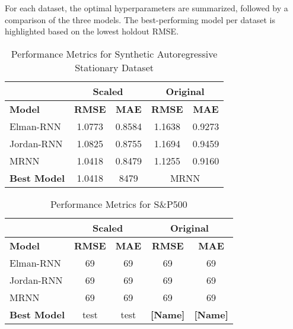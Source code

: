\documentclass[conference, 10pt]{IEEEtran}
\begin{document}
For each dataset, the optimal hyperparameters are summarized, followed by a comparison of the three models. The
best-performing model per dataset is highlighted based on the lowest holdout RMSE.

\begin{table}[h]
    \centering
    \begin{tabular}{|l|c|c|c|c|}
        \hline
        &\multicolumn{2}{c|}{\textbf{Scaled}} & \multicolumn{2}{c|}{\textbf{Original}} \\ 
        \hline
        \textbf{Model}& \textbf{RMSE} & \textbf{MAE} & \textbf{RMSE} & \textbf{MAE} \\ 
        \hline
        Elman-RNN& 1.0773 & 0.8584 & 1.1638 & 0.9273 \\ 
        \hline
        Jordan-RNN & 1.0825 & 0.8755 & 1.1694 & 0.9459 \\ 
        \hline
        MRNN & 1.0418 & 0.8479 & 1.1255 & 0.9160 \\ 
        \hline
        \textbf{Best Model} & 1.0418 & 8479 & \multicolumn{2}{c|}{{MRNN}} \\ 
        \hline
    \end{tabular}
    \vspace{4pt}
    \caption{Performance Metrics for Synthetic Autoregressive Stationary Dataset}
    \label{tab:results_ar1}
\end{table}

\begin{table}[h]
    \centering
    \begin{tabular}{|l|c|c|c|c|}
        \hline
        &\multicolumn{2}{c|}{\textbf{Scaled}} & \multicolumn{2}{c|}{\textbf{Original}} \\ 
        \hline
        \textbf{Model}& \textbf{RMSE} & \textbf{MAE} & \textbf{RMSE} & \textbf{MAE} \\ 
        \hline
        Elman-RNN& 69 & 69 & 69 & 69 \\ 
        \hline
        Jordan-RNN & 69 & 69 & 69 & 69 \\ 
        \hline
        MRNN & 69 & 69 & 69 & 69 \\ 
        \hline
        \textbf{Best Model} & test & test & \textbf{[Name]} & \textbf{[Name]} \\ 
        \hline
    \end{tabular}
    \vspace{4pt}
    \caption{Performance Metrics for S\&P500}
    \label{tab:results_spy}
\end{table}
\end{document}
